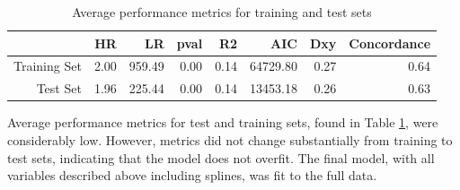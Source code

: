 \documentclass{article}
\begin{document}
\begin{table}[ht]
\centering
\caption{Average performance metrics for training and test sets} 
\begin{tabular}{rrrrrrrr}
  \hline
 & HR & LR & pval & R2 & AIC & Dxy & Concordance \\ 
  \hline
  Training Set & 2.00 & 959.49 & 0.00 & 0.14 & 64729.80 & 0.27 & 0.64 \\ 
  Test Set & 1.96 & 225.44 & 0.00 & 0.14 & 13453.18 & 0.26 & 0.63 \\ 
   \hline
\end{tabular}
\label{table:cv}
\end{table}

Average performance metrics for test and training sets, found in Table \ref{table:cv}, were considerably low. However, metrics did not change substantially from training to test sets, indicating that the model does not overfit. The final model, with all variables described above including splines, was fit to the full data.
\end{document}
